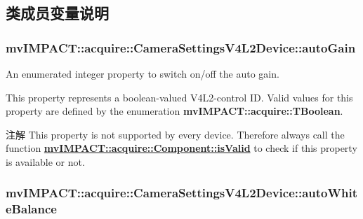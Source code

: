 \subsection{类成员变量说明}
\hypertarget{classmv_i_m_p_a_c_t_1_1acquire_1_1_camera_settings_v4_l2_device_a27d47ba5c43a2c52451d16e66aa65f42}{
\subsubsection[{auto\+Gain}]{ mv\+I\+M\+P\+A\+C\+T\+::acquire\+::\+Camera\+Settings\+V4\+L2\+Device\+::auto\+Gain}}\label{classmv_i_m_p_a_c_t_1_1acquire_1_1_camera_settings_v4_l2_device_a27d47ba5c43a2c52451d16e66aa65f42}


An enumerated integer property to switch on/off the auto gain. 

This property represents a boolean-\/valued V4\+L2-\/control I\+D. Valid values for this property are defined by the enumeration {\bfseries mv\+I\+M\+P\+A\+C\+T\+::acquire\+::\+T\+Boolean}.

\begin{DoxyNote}{注解}
This property is not supported by every device. Therefore always call the function {\bfseries \hyperlink{classmv_i_m_p_a_c_t_1_1acquire_1_1_component_ac51e55e7e046101f3c6119d84123abd5}{mv\+I\+M\+P\+A\+C\+T\+::acquire\+::\+Component\+::is\+Valid}} to check if this property is available or not. 
\end{DoxyNote}
\hypertarget{classmv_i_m_p_a_c_t_1_1acquire_1_1_camera_settings_v4_l2_device_ab83e95778d35ed8705faf39ba0e5f29b}{
\subsubsection[{auto\+White\+Balance}]{ mv\+I\+M\+P\+A\+C\+T\+::acquire\+::\+Camera\+Settings\+V4\+L2\+Device\+::auto\+White\+Balance}}\label{classmv_i_m_p_a_c_t_1_1acquire_1_1_camera_settings_v4_l2_device_ab83e95778d35ed8705faf39ba0e5f29b}


